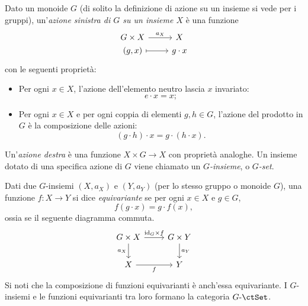 \begin{example}\label{ex_cat_g_insiemi}
	Dato un monoide \(G\) (di solito la definizione di azione su un insieme si vede per i gruppi), un'\emph{azione sinistra di \(G\) su un insieme \(X\)} è una funzione
	\[
		\begin{tikzcd}[row sep=0]
			G\times X \ar{r}{a_X} & X \\
			(g,x) \ar[mapsto]{r} & g\cdot x
		\end{tikzcd}
	\]
	con le seguenti proprietà:
	\begin{itemize}
		\item Per ogni \(x\in X\), l'azione dell'elemento neutro lascia \(x\) invariato:
		      \[
			      e\cdot x = x ;
		      \]
		\item Per ogni \(x\in X\) e per ogni coppia di elementi \(g,h\in G\), l'azione del prodotto in \(G\) è la composizione delle azioni:
		      \[
			      (g\cdot h)\cdot x = g\cdot(h\cdot x) .
		      \]
	\end{itemize}
	Un'\emph{azione destra} è una funzione \(X\times G\to X\) con proprietà analoghe.
	Un insieme dotato di una specifica azione di \(G\) viene chiamato un \emph{\(G\)-insieme}, o \emph{\(G\)-set}.

	Dati due \(G\)-insiemi \((X,a_X)\) e \((Y,a_Y)\) (per lo stesso gruppo o monoide \(G\)), una funzione \(f:X\to Y\) si dice \emph{equivariante} se per ogni \(x\in X\) e \(g\in G\),
	\[
		f(g\cdot x) = g\cdot f(x) ,
	\]
	ossia se il seguente diagramma commuta.
	\[
		\begin{tikzcd}
			G\times X \ar{r}{\id_G\times f} \ar[d, "a_X"'] & G\times Y \ar{d}{a_Y} \\
			X \ar[r, "f"'] & Y
		\end{tikzcd}
	\]
	Si noti che la composizione di funzioni equivarianti è anch'essa equivariante. I \(G\)-insiemi e le funzioni equivarianti tra loro formano la categoria \(G\emdash\ctSet\).
\end{example}
